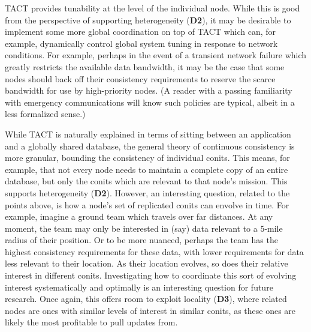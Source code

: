 TACT provides tunability at the level of the individual node. While this is good
from the perspective of supporting heterogeneity (\textbf{D2}), it may be
desirable to implement some more global coordination on top of TACT which can,
for example, dynamically control global system tuning in response to network
conditions. For example, perhaps in the event of a transient network failure
which greatly restricts the available data bandwidth, it may be the case that
some nodes should back off their consistency requirements to reserve the scarce
bandwidth for use by high-priority nodes. (A reader with a passing familiarity
with emergency communications will know such policies are typical, albeit in a
less formalized sense.)

While TACT is naturally explained in terms of sitting between an application and
a globally shared database, the general theory of continuous consistency is more
granular, bounding the consistency of individual conits. This means, for
example, that not every node needs to maintain a complete copy of an entire
database, but only the conits which are relevant to that node's mission. This
supports heterogeneity (\textbf{D2}). However, an interesting question, related
to the points above, is how a node's set of replicated conits can envolve in
time. For example, imagine a ground team which travels over far distances. At
any moment, the team may only be interested in (say) data relevant to a 5-mile
radius of their position. Or to be more nuanced, perhaps the team has the
highest consistency requirements for these data, with lower requirements for
data less relevant to their location. As their location evolves, so does their
relative interest in different conits. Investigating how to coordinate this sort
of evolving interest systematically and optimally is an interesting question for
future research. Once again, this offers room to exploit locality (\textbf{D3}),
where related nodes are ones with similar levels of interest in similar conits,
as these ones are likely the most profitable to pull updates from.

